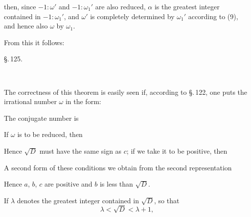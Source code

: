 
then, since $-1:\omega'$ and $-1:\omega_1'$ are also reduced, $\alpha$ is the greatest integer contained in $-1:\omega_1'$, and $\omega'$ is completely determined by $\omega_1'$ according to (9), and hence also $\omega$ by $\omega_1$.

From this it follows:


\begin{center}
\S.\,125.

\\
\end{center}


The correctness of this theorem is easily seen if, according to \S.\,122, one puts the irrational number $\omega$ in the form:


The conjugate number is


If $\omega$ is to be reduced, then


Hence $\sqrt{D}$ must have the same sign as $c$; if we take it to be positive, then


A second form of these conditions we obtain from the second representation


Hence $a$, $b$, $c$ are positive and $b$ is less than $\sqrt{D}$.

If $\lambda$ denotes the greatest integer contained in $\sqrt{D}$, so that
\[
\lambda < \sqrt{D} < \lambda + 1,
\]
